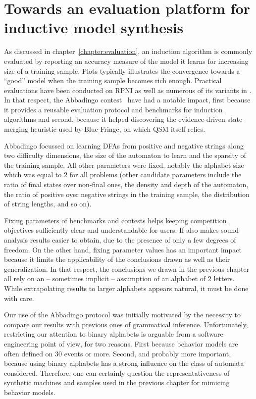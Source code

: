 \chapter{Towards an evaluation platform for inductive model synthesis\label{chapter:stamina}}

As discussed in chapter~\ref{chapter:evaluation}, an induction algorithm is commonly evaluated by reporting an accuracy measure of the model it learns for increasing size of a training sample. Plots typically illustrates the convergence towards a ``good'' model when the training sample becomes rich enough. Practical evaluations have been conducted on RPNI as well as numerous of its variants in \cite{Lang98,Damas06,Dupont08,Lambeau08}. In that respect, the Abbadingo contest~\cite{Lang98} have had a notable impact, first because it provides a reusable evaluation protocol and benchmarks for induction algorithms and second, because it helped discovering the evidence-driven state merging heuristic used by Blue-Fringe, on which QSM itself relies. 

Abbadingo focussed on learning DFAs from positive and negative strings along two difficulty dimensions, the size of the automaton to learn and the sparsity of the training sample. All other parameters were fixed, notably the alphabet size which was equal to 2 for all problems (other candidate parameters include the ratio of final states over non-final ones, the density and depth of the automaton, the ratio of positive over negative strings in the training sample, the distribution of string lengths, and so on).

Fixing parameters of benchmarks and contests helps keeping competition objectives sufficiently clear and understandable for users. If also makes sound analysis results easier to obtain, due to the presence of only a few degrees of freedom. On the other hand, fixing parameter values has an important impact because it limits the applicability of the conclusions drawn as well as their generalization. In that respect, the conclusions we drawn in the previous chapter all rely on an -- sometimes implicit -- assumption of an alphabet of 2 letters. While extrapolating results to larger alphabets appears natural, it must be done with care.

Our use of the Abbadingo protocol was initially motivated by the necessity to compare our results with previous ones of grammatical inference. Unfortunately, restricting our attention to binary alphabets is arguable from a software engineering point of view, for two reasons. First because behavior models are often defined on 30 events or more. Second, and probably more important, because using binary alphabets has a strong influence on the class of automata considered. Therefore, one can certainly question the representativeness of synthetic machines and samples used in the previous chapter for mimicing behavior models. 

